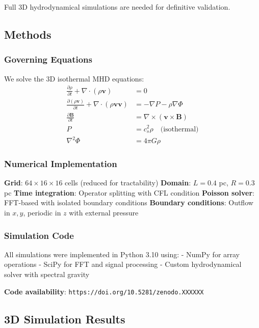 \documentclass[11pt,a4paper]{article}
\begin{document}
Full 3D hydrodynamical simulations are needed for definitive validation.

\subsection{Methods}

\subsubsection{Governing Equations}

We solve the 3D isothermal MHD equations:
\begin{align}
\frac{\partial \rho}{\partial t} + \nabla \cdot (\rho \mathbf{v}) &= 0 \\
\frac{\partial (\rho \mathbf{v})}{\partial t} + \nabla \cdot (\rho \mathbf{v} \mathbf{v}) &= -\nabla P - \rho \nabla \Phi \\
\frac{\partial \mathbf{B}}{\partial t} &= \nabla \times (\mathbf{v} \times \mathbf{B}) \\
P &= c_s^2 \rho \quad \text{(isothermal)} \\
\nabla^2 \Phi &= 4\pi G \rho
\end{align}

\subsubsection{Numerical Implementation}

\textbf{Grid}: $64 \times 16 \times 16$ cells (reduced for tractability)
\textbf{Domain}: $L = 0.4$ pc, $R = 0.3$ pc
\textbf{Time integration}: Operator splitting with CFL condition
\textbf{Poisson solver}: FFT-based with isolated boundary conditions
\textbf{Boundary conditions}: Outflow in $x,y$, periodic in $z$ with external pressure

\subsubsection{Simulation Code}

All simulations were implemented in Python 3.10 using:
- NumPy for array operations
- SciPy for FFT and signal processing
- Custom hydrodynamical solver with spectral gravity

\textbf{Code availability}: \texttt{https://doi.org/10.5281/zenodo.XXXXXX}

\subsection{3D Simulation Results}
\end{document}
